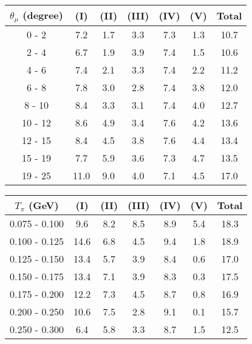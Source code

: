 \documentclass[aps, prd, reprint,showpacs,  preprintnumbers,amsmath,amssymb,superscriptaddress, nofootinbib]{revtex4-1}
\makeatletter
\renewenvironment{table}
  {\def\@captype{table}}
  {}
\makeatother
\begin{document}
\vspace{1cm}

\begin{table}
\centering
\begin{tabular}{ccccccc}
\hline
$\theta_{\mu}$ (degree) & (I) & (II) & (III) & (IV) & (V) & Total \\
\hline
    0 -     2  & 7.2  & 1.7  & 3.3  & 7.3  & 1.3  &10.7 \\
    2 -     4  & 6.7  & 1.9  & 3.9  & 7.4  & 1.5  &10.6 \\
    4 -     6  & 7.4  & 2.1  & 3.3  & 7.4  & 2.2  &11.2 \\
    6 -     8  & 7.8  & 3.0  & 2.8  & 7.4  & 3.8  &12.0 \\
    8 -    10  & 8.4  & 3.3  & 3.1  & 7.4  & 4.0  &12.7 \\
   10 -    12  & 8.6  & 4.9  & 3.4  & 7.6  & 4.2  &13.6 \\
   12 -    15  & 8.4  & 4.5  & 3.8  & 7.6  & 4.4  &13.4 \\
   15 -    19  & 7.7  & 5.9  & 3.6  & 7.3  & 4.7  &13.5 \\
   19 -    25  &11.0  & 9.0  & 4.0  & 7.1  & 4.5  &17.0 \\
\hline
\hline
\end{tabular}
\caption{Fractional systematic uncertainties (in percent) for $d\sigma/d\theta_\mu$.}
\label{tb:syst-muon-angler}
\end{table}

\vspace{1cm}

\begin{table}
\centering
\begin{tabular}{ccccccc}
\hline
$T_{\pi}$ (GeV) & (I) & (II) & (III) & (IV) & (V) & Total \\
\hline
0.075 - 0.100  & 9.6  & 8.2  & 8.5  & 8.9  & 5.4  &18.3 \\
0.100 - 0.125  &14.6  & 6.8  & 4.5  & 9.4  & 1.8  &18.9 \\
0.125 - 0.150  &13.4  & 5.7  & 3.9  & 8.4  & 0.6  &17.0 \\
0.150 - 0.175  &13.4  & 7.1  & 3.9  & 8.3  & 0.3  &17.5 \\
0.175 - 0.200  &12.2  & 7.3  & 4.5  & 8.7  & 0.8  &16.9 \\
0.200 - 0.250  &10.6  & 7.5  & 2.8  & 9.1  & 0.1  &15.7 \\
0.250 - 0.300  & 6.4  & 5.8  & 3.3  & 8.7  & 1.5  &12.5 \\
\hline
\hline
\end{tabular}
\caption{Fractional systematic uncertainties (in percent) for $d\sigma/dT_\pi$.}
\label{tb:syst-pion-KE}
\end{table}
\end{document}
